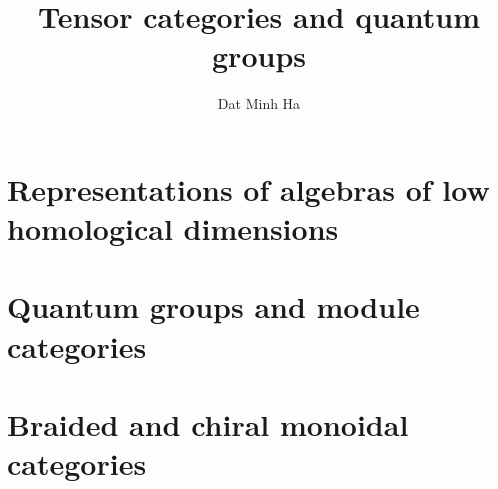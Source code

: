 

\setcounter{section}{-1}





	\title{Tensor categories and quantum groups}
	
	\author{Dat Minh Ha}
	\maketitle
	
	\begin{abstract}
	    
	\end{abstract}
	
	{
      \hypersetup{} 
      \dominitoc
      \tableofcontents %
    }
    
    \chapter{Representations of algebras of low homological dimensions}
        \begin{abstract}
            
        \end{abstract}
        
        \minitoc
        
        
        
        
    
    \chapter{Quantum groups and module categories}
        \begin{abstract}
            
        \end{abstract}
        
        \minitoc
        
        
        
        
    
    \chapter{Braided and chiral monoidal categories}
        \begin{abstract}
            
        \end{abstract}
        
